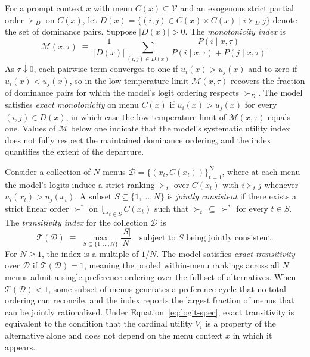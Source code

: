 \begin{definition}\label{def:monotonicity}
  For a prompt context $x$ with menu $C(x) \subseteq \mathcal{V}$ and an exogenous strict partial order $\succ_D$ on $C(x)$, let $D(x) = \{(i,j) \in C(x) \times C(x) \mid i \succ_D j\}$ denote the set of dominance pairs. Suppose $|D(x)| > 0$. The \emph{monotonicity index} is
  \begin{equation}\label{eq:monotonicity}
    \mathcal{M}(x, \tau) \;\equiv\; \frac{1}{|D(x)|} \sum_{(i,j) \in D(x)} \frac{P(i \mid x, \tau)}{P(i \mid x, \tau) + P(j \mid x, \tau)}.
  \end{equation}
  As $\tau \downarrow 0$, each pairwise term converges to one if $u_i(x) > u_j(x)$ and to zero if $u_i(x) < u_j(x)$, so in the low-temperature limit $\mathcal{M}(x, \tau)$ recovers the fraction of dominance pairs for which the model's logit ordering respects $\succ_D$. The model satisfies \emph{exact monotonicity} on menu $C(x)$ if $u_i(x) > u_j(x)$ for every $(i,j) \in D(x)$, in which case the low-temperature limit of $\mathcal{M}(x, \tau)$ equals one. Values of $\mathcal{M}$ below one indicate that the model's systematic utility index does not fully respect the maintained dominance ordering, and the index quantifies the extent of the departure.
\end{definition}

\begin{definition}\label{def:transitivity}
  Consider a collection of $N$ menus $\mathcal{D} = \{(x_t, C(x_t))\}_{t=1}^{N}$, where at each menu the model's logits induce a strict ranking $\succ_t$ over $C(x_t)$ with $i \succ_t j$ whenever $u_i(x_t) > u_j(x_t)$. A subset $S \subseteq \{1, \ldots, N\}$ is \emph{jointly consistent} if there exists a strict linear order $\succ^*$ on $\bigcup_{t \in S} C(x_t)$ such that $\succ_t \,\subseteq\, \succ^*$ for every $t \in S$. The \emph{transitivity index} for the collection $\mathcal{D}$ is
  \begin{equation}\label{eq:transitivity}
    \mathcal{T}(\mathcal{D}) \;\equiv\; \max_{S \subseteq \{1, \ldots, N\}} \frac{|S|}{N} \quad \text{subject to } S \text{ being jointly consistent.}
  \end{equation}
  For $N \geq 1$, the index is a multiple of $1/N$. The model satisfies \emph{exact transitivity} over $\mathcal{D}$ if $\mathcal{T}(\mathcal{D}) = 1$, meaning the pooled within-menu rankings across all $N$ menus admit a single preference ordering over the full set of alternatives. When $\mathcal{T}(\mathcal{D}) < 1$, some subset of menus generates a preference cycle that no total ordering can reconcile, and the index reports the largest fraction of menus that can be jointly rationalized. Under Equation~\eqref{eq:logit-spec}, exact transitivity is equivalent to the condition that the cardinal utility $V_i$ is a property of the alternative alone and does not depend on the menu context $x$ in which it appears.
\end{definition}


